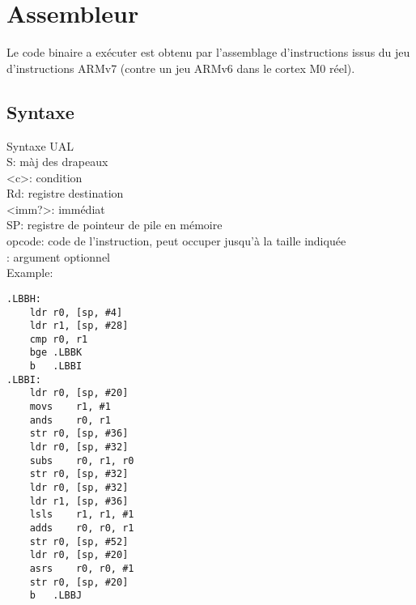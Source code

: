 \section{Assembleur}

	Le code binaire a exécuter est obtenu par l'assemblage d'instructions issus du jeu d'instructions ARMv7 (contre un jeu ARMv6 dans le cortex M0 réel).

\subsection{Syntaxe}
Syntaxe UAL\\
S: màj des drapeaux\\
<c>: condition\\
Rd: registre destination\\
<imm?>: immédiat\\
SP: registre de pointeur de pile en mémoire\\
opcode: code de l'instruction, peut occuper jusqu'à la taille indiquée\\
\[\]: argument optionnel\\

Example:
\begin{lstlisting}
.LBBH:                                
	ldr	r0, [sp, #4]
	ldr	r1, [sp, #28]
	cmp	r0, r1
	bge	.LBBK
	b	.LBBI
.LBBI:                                
	ldr	r0, [sp, #20]
	movs	r1, #1
	ands	r0, r1
	str	r0, [sp, #36]
	ldr	r0, [sp, #32]
	subs	r0, r1, r0
	str	r0, [sp, #32]
	ldr	r0, [sp, #32]
	ldr	r1, [sp, #36]
	lsls	r1, r1, #1
	adds	r0, r0, r1
	str	r0, [sp, #52]
	ldr	r0, [sp, #20]
	asrs	r0, r0, #1
	str	r0, [sp, #20]
	b	.LBBJ
\end{lstlisting}
